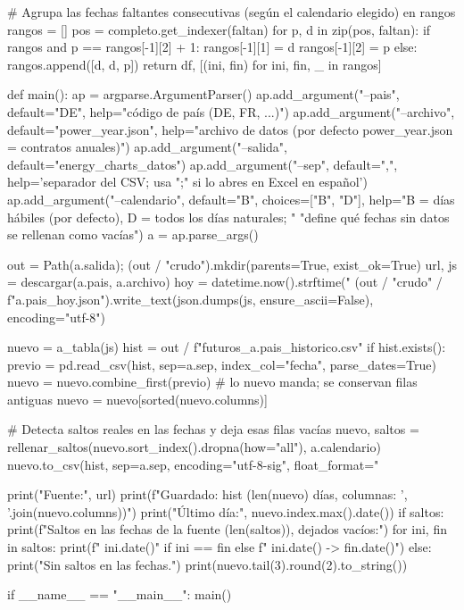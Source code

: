 \documentclass[11pt,letterpaper]{article}
\theoremstyle{plain}
\theoremstyle{definition}
\theoremstyle{remark}
\numberwithin{equation}{section}
\begin{document}
\begin{pythoncode}[
    caption={Código Python para la obtención de precios históricos de futuros},
    label={cod:extraccion_futuros}
]
    # Agrupa las fechas faltantes consecutivas (según el calendario elegido) en rangos
    rangos = []
    pos = completo.get_indexer(faltan)
    for p, d in zip(pos, faltan):
        if rangos and p == rangos[-1][2] + 1:
            rangos[-1][1] = d
            rangos[-1][2] = p
        else:
            rangos.append([d, d, p])
    return df, [(ini, fin) for ini, fin, _ in rangos]


def main():
    ap = argparse.ArgumentParser()
    ap.add_argument("--pais", default="DE", help="código de país (DE, FR, ...)")
    ap.add_argument("--archivo", default="power_year.json",
                    help="archivo de datos (por defecto power_year.json = contratos anuales)")
    ap.add_argument("--salida", default="energy_charts_datos")
    ap.add_argument("--sep", default=",", help='separador del CSV; usa ";" si lo abres en Excel en español')
    ap.add_argument("--calendario", default="B", choices=["B", "D"],
                    help="B = días hábiles (por defecto), D = todos los días naturales; "
                         "define qué fechas sin datos se rellenan como vacías")
    a = ap.parse_args()

    out = Path(a.salida); (out / "crudo").mkdir(parents=True, exist_ok=True)
    url, js = descargar(a.pais, a.archivo)
    hoy = datetime.now().strftime("%
    (out / "crudo" / f"{a.pais}_{hoy}.json").write_text(json.dumps(js, ensure_ascii=False), encoding="utf-8")

    nuevo = a_tabla(js)
    hist = out / f"futuros_{a.pais}_historico.csv"
    if hist.exists():
        previo = pd.read_csv(hist, sep=a.sep, index_col="fecha", parse_dates=True)
        nuevo = nuevo.combine_first(previo)      # lo nuevo manda; se conservan filas antiguas
        nuevo = nuevo[sorted(nuevo.columns)]

    # Detecta saltos reales en las fechas y deja esas filas vacías
    nuevo, saltos = rellenar_saltos(nuevo.sort_index().dropna(how="all"), a.calendario)
    nuevo.to_csv(hist, sep=a.sep, encoding="utf-8-sig", float_format="%

    print("Fuente:", url)
    print(f"Guardado: {hist}  ({len(nuevo)} días, columnas: {', '.join(nuevo.columns)})")
    print("Último día:", nuevo.index.max().date())
    if saltos:
        print(f"Saltos en las fechas de la fuente ({len(saltos)}), dejados vacíos:")
        for ini, fin in saltos:
            print(f"  {ini.date()}" if ini == fin else f"  {ini.date()} -> {fin.date()}")
    else:
        print("Sin saltos en las fechas.")
    print(nuevo.tail(3).round(2).to_string())


if __name__ == "__main__":
    main()
\end{pythoncode}
\end{document}
